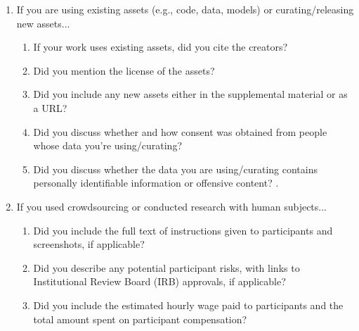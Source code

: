 \begin{enumerate}
\item If you are using existing assets (e.g., code, data, models) or curating/releasing new assets...
\begin{enumerate}
  \item If your work uses existing assets, did you cite the creators? 
  \item Did you mention the license of the assets? 
  \item Did you include any new assets either in the supplemental material or as a URL?
    \answerNo{}
  \item Did you discuss whether and how consent was obtained from people whose data you're using/curating?
  \item Did you discuss whether the data you are using/curating contains personally identifiable information or offensive content?
    .
\end{enumerate}


\item If you used crowdsourcing or conducted research with human subjects...
\begin{enumerate}
  \item Did you include the full text of instructions given to participants and screenshots, if applicable?
    \answerNA{}
  \item Did you describe any potential participant risks, with links to Institutional Review Board (IRB) approvals, if applicable?
    \answerNA{}
  \item Did you include the estimated hourly wage paid to participants and the total amount spent on participant compensation?
    \answerNA{}
\end{enumerate}


\end{enumerate}